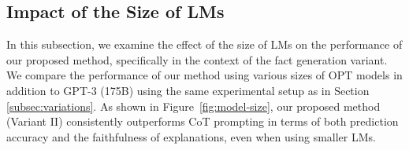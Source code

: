 \subsection{Impact of the Size of LMs}
\label{subsec:model-size}
In this subsection, we examine the effect of the size of LMs on the performance of our proposed method, specifically in the context of the fact generation variant. We compare the performance of our method using various sizes of OPT models \cite{zhang2022opt} in addition to GPT-3 (175B) using the same experimental setup as in Section \ref{subsec:variations}. As shown in Figure~\ref{fig:model-size}, our proposed method (Variant II) consistently outperforms CoT prompting in terms of both prediction accuracy and the faithfulness of explanations, even when using smaller LMs.

